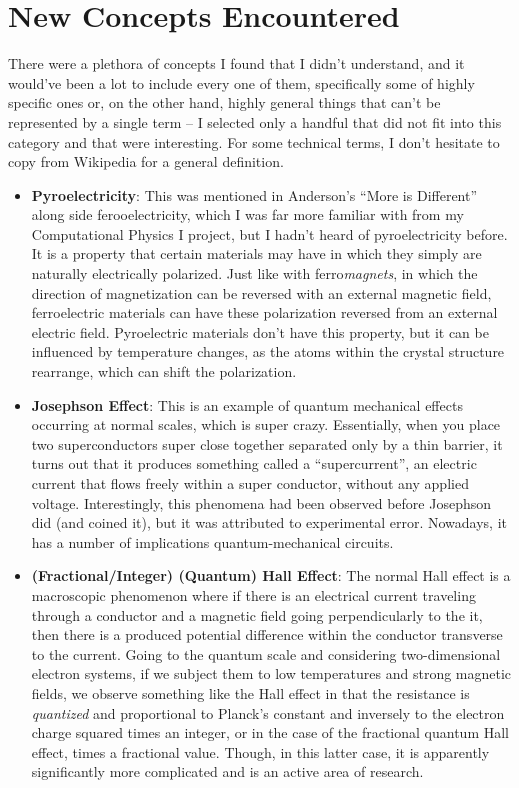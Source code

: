 \section{New Concepts Encountered}

There were a plethora of concepts I found that I didn't understand, and it would've been a lot to include every one of them, specifically some of highly specific ones or, on the other hand, highly general things that can't be represented by a single term -- I selected only a handful that did not fit into this category and that were interesting. For some technical terms, I don't hesitate to copy from Wikipedia for a general definition.


\begin{itemize}
  
\item \textbf{Pyroelectricity}: This was mentioned in Anderson's ``More is Different'' along side ferooelectricity, which I was far more familiar with from my Computational Physics I project, but I hadn't heard of pyroelectricity before. It is a property that certain materials may have in which they simply are naturally electrically polarized. Just like with ferro\textit{magnets}, in which the direction of magnetization can be reversed with an external magnetic field, ferroelectric materials can have these polarization reversed from an external electric field. Pyroelectric materials don't have this property, but it can be influenced by temperature changes, as the atoms within the crystal structure rearrange, which can shift the polarization.
  
\item \textbf{Josephson Effect}: This is an example of quantum mechanical effects occurring at normal scales, which is super crazy. Essentially, when you place two superconductors super close together separated only by a thin barrier, it turns out that it produces something called a ``supercurrent'', an electric current that flows freely within a super conductor, without any applied voltage. Interestingly, this phenomena had been observed before Josephson did (and coined it), but it was attributed to experimental error. Nowadays, it has a number of implications quantum-mechanical circuits.
  
\item \textbf{(Fractional/Integer) (Quantum) Hall Effect}: The normal Hall effect is a macroscopic phenomenon where if there is an electrical current traveling through a conductor and a magnetic field going perpendicularly to the it, then there is a produced potential difference within the conductor transverse to the current. Going to the quantum scale and considering two-dimensional electron systems, if we subject them to low temperatures and strong magnetic fields, we observe something like the Hall effect in that the resistance is \textit{quantized} and proportional to Planck's constant and inversely to the electron charge squared times an integer, or in the case of the fractional quantum Hall effect, times a fractional value. Though, in this latter case, it is apparently significantly more complicated and is an active area of research.
  

\end{itemize}
